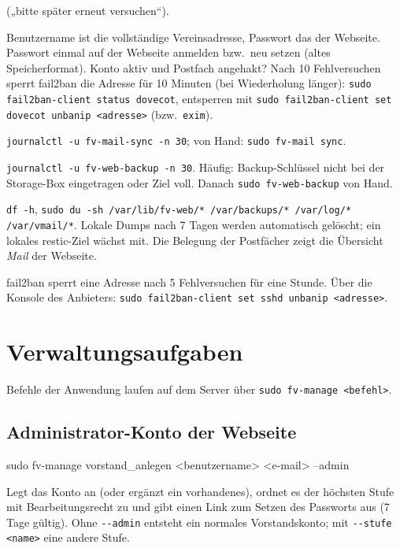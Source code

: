 \documentclass[a4paper,fontsize=10pt]{scrartcl}
\newcommand*{\cmd}[1]{\texttt{#1}}
\begin{document}
\begin{description}[style=nextline,leftmargin=0pt,itemsep=0.5\baselineskip]
    („bitte später erneut versuchen“).
  \item[Mailprogramm: Anmeldung schlägt fehl]
    Benutzername ist die vollständige Vereinsadresse, Passwort das der Webseite.
    Passwort einmal auf der Webseite anmelden bzw.\ neu setzen (altes Speicherformat).
    Konto aktiv und Postfach angehakt? Nach 10 Fehlversuchen sperrt fail2ban die
    Adresse für 10 Minuten (bei Wiederholung länger):
    \cmd{sudo fail2ban-client status dovecot}, entsperren mit
    \cmd{sudo fail2ban-client set dovecot unbanip <adresse>} (bzw.\ \cmd{exim}).
  \item[Abwesenheitsnotiz, Archiv oder Belegung aktualisieren sich nicht]
    \cmd{journalctl -u fv-mail-sync -n 30}; von Hand: \cmd{sudo fv-mail sync}.
  \item[Sicherung fehlgeschlagen]
    \cmd{journalctl -u fv-web-backup -n 30}. Häufig: Backup-Schlüssel nicht bei der
    Storage-Box eingetragen oder Ziel voll. Danach \cmd{sudo fv-web-backup} von Hand.
  \item[Platte voll]
    \cmd{df -h}, \cmd{sudo du -sh /var/lib/fv-web/* /var/backups/* /var/log/* /var/vmail/*}.
    Lokale Dumps nach 7 Tagen werden automatisch gelöscht; ein lokales restic-Ziel
    wächst mit. Die Belegung der Postfächer zeigt die Übersicht \emph{Mail} der Webseite.
  \item[Anmeldung per SSH gesperrt]
    fail2ban sperrt eine Adresse nach 5 Fehlversuchen für eine Stunde. Über die
    Konsole des Anbieters: \cmd{sudo fail2ban-client set sshd unbanip <adresse>}.
\end{description}

\section{Verwaltungsaufgaben}\label{sec:verwaltung}

Befehle der Anwendung laufen auf dem Server über \cmd{sudo fv-manage <befehl>}.

\subsection{Administrator-Konto der Webseite}

\begin{befehl}
sudo fv-manage vorstand_anlegen <benutzername> <e-mail> --admin
\end{befehl}

Legt das Konto an (oder ergänzt ein vorhandenes), ordnet es der höchsten Stufe mit
Bearbeitungsrecht zu und gibt einen Link zum Setzen des Passworts aus (7 Tage
gültig). Ohne \cmd{-{}-admin} entsteht ein normales Vorstandskonto; mit
\cmd{-{}-stufe <name>} eine andere Stufe.
\end{document}
